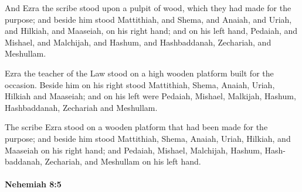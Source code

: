 			\begin{versebox}
					\item[BHS] 
					\item[LXX] 
					\item[ASV] And Ezra the scribe stood upon a pulpit of wood, which they had made for the purpose; and beside him stood Mattithiah, and Shema, and Anaiah, and Uriah, and Hilkiah, and Maaseiah, on his right hand; and on his left hand, Pedaiah, and Mishael, and Malchijah, and Hashum, and Hashbaddanah, Zechariah, and Meshullam.
					\item[NIV] Ezra the teacher of the Law stood on a high wooden platform built for the occasion. Beside him on his right stood Mattithiah, Shema, Anaiah, Uriah, Hilkiah and Maaseiah; and on his left were Pedaiah, Mishael, Malkijah, Hashum, Hashbaddanah, Zechariah and Meshullam.
					\item[NRSV] The scribe Ezra stood on a wooden platform that had been made for the purpose; and beside him stood Mattithiah, Shema, Anaiah, Uriah, Hilkiah, and Maaseiah on his right hand; and Pedaiah, Mishael, Malchijah, Hashum, Hash-baddanah, Zechariah, and Meshullam on his left hand.
			\end{versebox}

		\paragraph{Nehemiah 8:5} %
			\label{NEHEMIAH-8-5}

